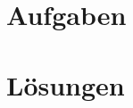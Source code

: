 \documentclass[a4paper,11pt,german]{report}
\begin{document}

\section*{\hfil Aufgaben \hfil}

\newpage
\section*{\hfil Lösungen \hfil}


\end{document}
